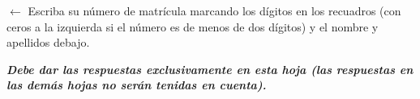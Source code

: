 \documentclass[a4paper]{article}
\def\AMCcleardoublepage{\ifodd\thepage\clearpage\mbox{}\fi\clearpage}
\begin{document}
{\vspace{4mm}
\hrulefill
\vspace{4mm}



\clearpage

\AMCformBegin    


\noindent{}\hspace*{\fill}
\begin{minipage}{.7\linewidth}
$\longleftarrow{}$ Escriba su número de matrícula marcando los dígitos
en los recuadros (con ceros a la izquierda si el número es de menos de dos dígitos) y el nombre y apellidos debajo.

\vspace{3ex}

\end{minipage}

\begin{center}
 \bf\em Debe dar las respuestas exclusivamente en esta hoja (las respuestas en las demás hojas no serán tenidas en cuenta).
\end{center}



\AMCform    

\AMCcleardoublepage    

}  
\end{document}
